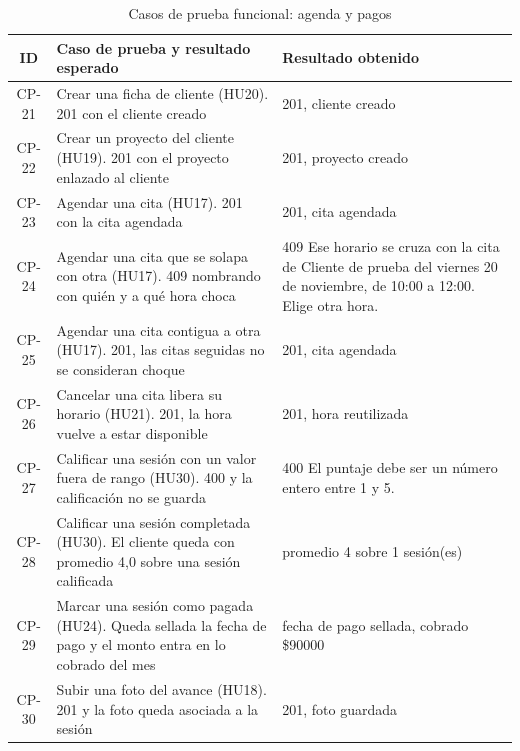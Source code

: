 \documentclass[12pt,letterpaper,oneside]{report}
\begin{document}
\begin{table}[H]
  \centering
  \caption{Casos de prueba funcional: agenda y pagos}
  \label{tab:casosagenda}
  \renewcommand{\arraystretch}{1.2}
  \footnotesize
  \begin{tabular}{|c|p{5.9cm}|p{5.3cm}|}
    \hline
    \textbf{ID} & \textbf{Caso de prueba y resultado esperado} & \textbf{Resultado obtenido} \\
    \hline
    CP-21 & Crear una ficha de cliente (HU20). 201 con el cliente creado & 201, cliente creado \\ \hline
    CP-22 & Crear un proyecto del cliente (HU19). 201 con el proyecto enlazado al cliente & 201, proyecto creado \\ \hline
    CP-23 & Agendar una cita (HU17). 201 con la cita agendada & 201, cita agendada \\ \hline
    CP-24 & Agendar una cita que se solapa con otra (HU17). 409 nombrando con quién y a qué hora choca & 409 Ese horario se cruza con la cita de Cliente de prueba del viernes 20 de noviembre, de 10:00 a 12:00. Elige otra hora. \\ \hline
    CP-25 & Agendar una cita contigua a otra (HU17). 201, las citas seguidas no se consideran choque & 201, cita agendada \\ \hline
    CP-26 & Cancelar una cita libera su horario (HU21). 201, la hora vuelve a estar disponible & 201, hora reutilizada \\ \hline
    CP-27 & Calificar una sesión con un valor fuera de rango (HU30). 400 y la calificación no se guarda & 400 El puntaje debe ser un número entero entre 1 y 5. \\ \hline
    CP-28 & Calificar una sesión completada (HU30). El cliente queda con promedio 4,0 sobre una sesión calificada & promedio 4 sobre 1 sesión(es) \\ \hline
    CP-29 & Marcar una sesión como pagada (HU24). Queda sellada la fecha de pago y el monto entra en lo cobrado del mes & fecha de pago sellada, cobrado \$90000 \\ \hline
    CP-30 & Subir una foto del avance (HU18). 201 y la foto queda asociada a la sesión & 201, foto guardada \\ \hline
  \end{tabular}
\end{table}
\end{document}
